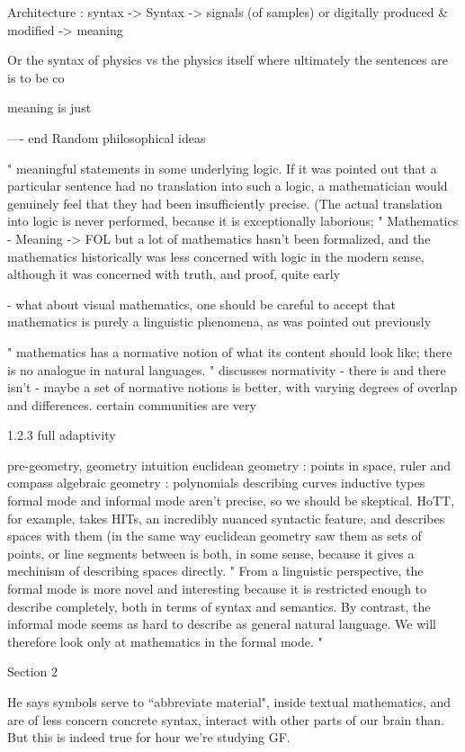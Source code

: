 Architecture : 
syntax -> 
Syntax -> signals (of samples) or digitally produced & modified -> 
meaning 

Or the syntax of physics vs the physics itself
where ultimately the sentences are is to be co

meaning is just 

---- end Random philosophical ideas

"
meaningful statements in some underlying logic. If it was pointed out that
a particular sentence had no translation into such a logic, a mathematician
would genuinely feel that they had been insufficiently precise. (The actual
translation into logic is never performed, because it is exceptionally laborious;
"
Mathematics - Meaning -> FOL 
but a lot of mathematics hasn't been formalized, and the mathematics
historically was less concerned with logic in the modern sense, although it was
concerned with truth, and proof, quite early


- what about visual mathematics, one should be careful to accept that
mathematics is purely a linguistic phenomena, as was pointed out previously


"
mathematics has a normative notion of what its content should look like; there is no
analogue in natural languages.
"
discusses normativity - there is and there isn't - maybe a set of normative
notions is better, with varying degrees of overlap and differences. certain communities are very 

1.2.3 full adaptivity

pre-geometry, geometry intuition
euclidean geometry : points in space,  ruler and compass
algebraic geometry : polynomials describing curves
inductive types
formal mode and informal mode aren't precise, so we should be skeptical.  HoTT,
for example, takes HITs, an incredibly nuanced syntactic feature, and describes
spaces with them (in the same way euclidean geometry saw them as sets of points,
or line segments between 
is both, in some sense, because it gives a mechinism of describing spaces
directly. 
"
From a linguistic perspective, the formal mode is more novel and interesting
because it is restricted enough to describe completely, both in terms of syntax
and semantics. By contrast, the informal mode seems as hard to describe as
general natural language. We will therefore look only at mathematics in the
formal mode.
"


Section 2

He says symbols serve to ``abbreviate material", 
inside textual mathematics, and are of less concern 
concrete syntax, interact with other parts of our brain than. But this is indeed
true for hour we're studying GF.

